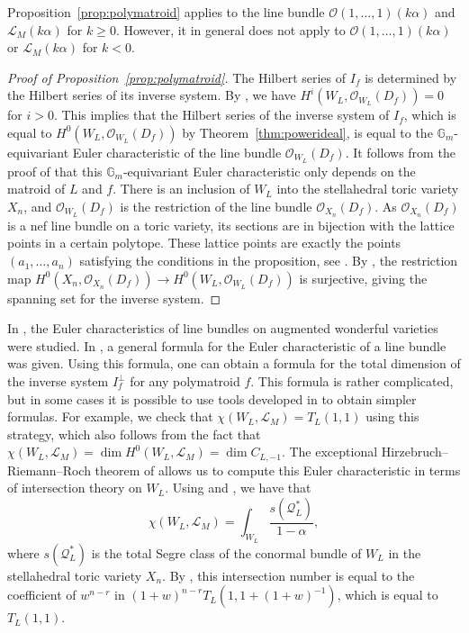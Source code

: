 \documentclass{amsart}
\theoremstyle{definition}
\begin{document}
Proposition~\ref{prop:polymatroid} applies to the line bundle $\mathcal{O}(1, \dotsc, 1)(k\alpha)$ and $\mathcal{L}_M(k\alpha)$ for $k \ge 0$. However, it in general does not apply to $\mathcal{O}(1, \dotsc, 1)(k\alpha)$ or $\mathcal{L}_M(k\alpha)$ for $k < 0$. 

\begin{proof}[Proof of Proposition~\ref{prop:polymatroid}]
The Hilbert series of $I_f$ is determined by the Hilbert series of its inverse system.
By \cite[Theorem 5.5]{EFL}, we have $H^i(W_L, \mathcal{O}_{W_L}(D_f)) = 0$ for $i > 0$. This implies that the Hilbert series of the inverse system of $I_f$, which is equal to $H^0(W_L, \mathcal{O}_{W_L}(D_f))$ by Theorem~\ref{thm:powerideal}, is equal to the $\mathbb{G}_m$-equivariant Euler characteristic of the line bundle $\mathcal{O}_{W_L}(D_f)$. It follows from the proof of \cite[Corollary 5.4]{EHL} that this $\mathbb{G}_m$-equivariant Euler characteristic only depends on the matroid of $L$ and $f$. There is an inclusion of $W_L$ into the stellahedral toric variety $X_n$, and $\mathcal{O}_{W_L}(D_f)$ is the restriction of the line bundle $\mathcal{O}_{X_n}(D_f)$. As $\mathcal{O}_{X_n}(D_f)$ is a nef line bundle on a toric variety, its sections are in bijection with the lattice points in a certain polytope. These lattice points are exactly the points $(a_1, \dotsc, a_n)$ satisfying the conditions in the proposition, see \cite[Section 3.3]{EHL}. By \cite[Theorem 5.5]{EFL}, the restriction map $H^0(X_n, \mathcal{O}_{X_n}(D_f)) \to H^0(W_L, \mathcal{O}_{W_L}(D_f))$ is surjective, giving the spanning set for the inverse system. 
\end{proof}

In \cite{LLPP}, the Euler characteristics of line bundles on augmented wonderful varieties were studied. In \cite[Theorem 7.2]{LLPP}, a general formula for the Euler characteristic of a line bundle was given. Using this formula, one can obtain a formula for the total dimension of the inverse system $I_f^{\perp}$ for any polymatroid $f$. This formula is rather complicated, but in some cases it is possible to use tools developed in \cite{LLPP} to obtain simpler formulas. For example, we check that $\chi(W_L, \mathcal{L}_M) = T_L(1,1)$ using this strategy, which also follows from the fact that $\chi(W_L, \mathcal{L}_M) = \dim H^0(W_L, \mathcal{L}_M) = \dim C_{L, -1}$. The exceptional Hirzebruch--Riemann--Roch theorem of \cite[Theorem 1.6]{LLPP} allows us to compute this Euler characteristic in terms of intersection theory on $W_L$. Using \cite[Corollary 6.5]{EHL} and \cite[Proposition 5.3]{LLPP}, we have that
$$\chi(W_L, \mathcal{L}_M) = \int_{W_L} \frac{s(\mathcal{Q}_L^*)}{1 - \alpha},$$
where $s(\mathcal{Q}_L^{*})$ is the total Segre class of the conormal bundle of $W_L$ in the stellahedral toric variety $X_n$. By \cite[Theorem 1.11 and Corollary 5.11(1)]{EHL}, this intersection number is equal to the coefficient of $w^{n-r}$ in $(1 + w)^{n-r} T_L(1, 1 + (1 + w)^{-1})$, which is equal to $T_L(1,1)$. 
\end{document}
